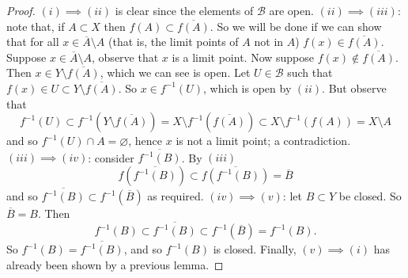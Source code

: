 \begin{proof}
	$(i) \implies (ii)$ is clear since the elements of $\mathcal B$ are open.
	$(ii) \implies (iii)$: note that, if $A \subset X$ then $f(A) \subset \overline{f(A)}$.
	So we will be done if we can show that for all $x \in \overline A \setminus A$ (that is, the limit points of $A$ not in $A$) $f(x) \in \overline{f(A)}$.
	Suppose $x \in \overline A \setminus A$, observe that $x$ is a limit point.
	Now suppose $f(x) \not\in \overline{f(A)}$.
	Then $x \in Y \setminus \overline{f(A)}$, which we can see is open.
	Let $U \in \mathcal B$ such that $f(x) \in U \subset Y \setminus \overline{f(A)}$.
	So $x \in f^{-1}(U)$, which is open by $(ii)$. 
	But observe that
	\[
		f^{-1}(U) 
		\subset f^{-1}\left(Y \setminus \overline{f(A)}\right)
		= X \setminus f^{-1}\left(\overline{f(A)}\right) 
		\subset X \setminus f^{-1}\left( f(A) \right)
		= X \setminus A
	\]
	and so $f^{-1}(U) \cap A = \varnothing$, hence $x$ is not a limit point;
	a contradiction. 
	$(iii) \implies (iv)$: consider $\overline{f^{-1}(B)}$.
	By $(iii)$
	\[
		f\left( \overline{f^{-1}(B)} \right)
		\subset \overline{f\left(f^{-1}(B)\right)}
		= \overline B
	\]
	and so $\overline{f^{-1}(B)} \subset f^{-1}(\overline B)$ as required.
	$(iv) \implies (v)$: let $B \subset Y$ be closed.
	So $\overline B = B$.
	Then
	\[
		f^{-1}(B) 
		\subset \overline{f^{-1}(B)} 
		\subset f^{-1}(\overline B) 
		= f^{-1}(B).
	\]
	So $f^{-1}(B) = \overline{f^{-1}(B)}$, and so $f^{-1}(B)$ is closed.
	Finally, $(v) \implies (i)$ has already been shown by a previous lemma.
\end{proof}
